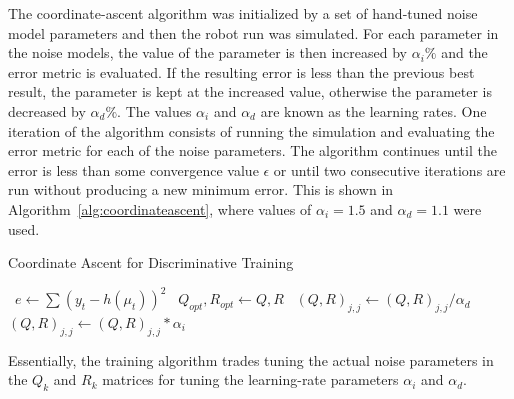 The coordinate-ascent algorithm was initialized by a set of hand-tuned noise model parameters and then the robot run was simulated.
For each parameter in the noise models, the value of the parameter is then increased by $\alpha_i \%$ and the error metric is evaluated.
If the resulting error is less than the previous best result, the parameter is kept at the increased value, otherwise the parameter is decreased by $\alpha_d \%$.
The values $\alpha_i$ and $\alpha_d$ are known as the learning rates.
One iteration of the algorithm consists of running the simulation and evaluating the error metric for each of the noise parameters.
The algorithm continues until the error is less than some convergence value $\epsilon$ or until two consecutive iterations are run without producing a new minimum error.
This is shown in Algorithm~\ref{alg:coordinateascent}, where values of $\alpha_i=1.5$ and $\alpha_d=1.1$ were used.

\begin{algorithm}
\caption{Coordinate Ascent for Discriminative Training}%
\label{alg:coordinateascent}
\begin{algorithmic}
        \STATE~$e \gets \sum{(y_t-h(\mu_t))}^2$
            \STATE~$Q_{opt}, R_{opt} \gets Q, R$
            \STATE~${(Q,R)}_{j,j} \gets {(Q,R)}_{j,j} / \alpha_d$
        \ELSE%
            \STATE~${(Q,R)}_{j,j} \gets {(Q,R)}_{j,j} * \alpha_i$
        \ENDIF%
    \ENDFOR%
\ENDWHILE%
\end{algorithmic}
\end{algorithm}

Essentially, the training algorithm trades tuning the actual noise parameters in the $Q_k$ and $R_k$ matrices for tuning the learning-rate parameters $\alpha_i$ and $\alpha_d$.

